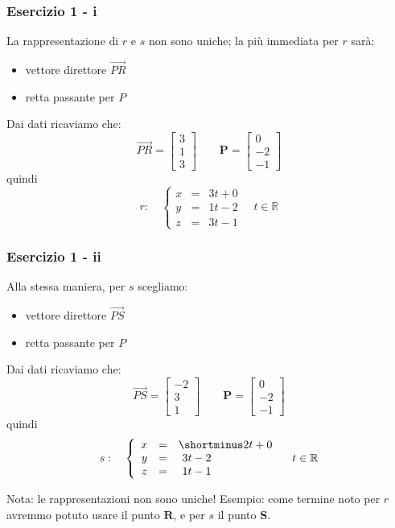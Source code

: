 \documentclass{beamer}
\begin{document}
\begin{frame}
\frametitle{Esercizio 1 - i}

La rappresentazione di $r$ e $s$ non sono uniche; la pi\`u immediata per $r$ sar\`a:
\begin{itemize}
        \item vettore direttore $\overrightarrow{PR}$
        \item retta passante per $P$
\end{itemize}
Dai dati ricaviamo che:
$$
\overrightarrow{PR} = \left[
\begin{array}{c}
3\\
1\\
3
\end{array}
\right]
\qquad
\mathbf P = \left[
\begin{array}{c}
0\\
-2\\
-1
\end{array}
\right]
$$
quindi 
$$r: \quad \left\{
\begin{array}{rcl}
x&=&3t+0\\
y&=&1t-2\\
z&=&3t-1
\end{array}
\right. \quad t\in \mathbb{R}
$$
\end{frame}

\begin{frame}
\frametitle{Esercizio 1 - ii}

Alla stessa maniera, per $s$ scegliamo:
\begin{itemize}
        \item vettore direttore $\overrightarrow{PS}$
        \item retta passante per $P$
\end{itemize}
Dai dati ricaviamo che:
$$
\overrightarrow{PS} = \left[
\begin{array}{c}
-2\\
3\\
1
\end{array}
\right]
\qquad
\mathbf P = \left[
\begin{array}{c}
0\\
-2\\
-1
\end{array}
\right]
$$
quindi 
$$s: \quad \left\{
\begin{array}{rcl}
x&=&\shortminus 2t+0\\
y&=&\ 3t-2\\
z&=&\ 1t-1
\end{array}
\right. \quad t\in \mathbb{R}
$$

Nota: le rappresentazioni non sono uniche! Esempio: come termine noto
per $r$ avremmo potuto usare il punto $\mathbf R$, e per $s$ il punto $\mathbf S$.
\end{frame}
\end{document}
